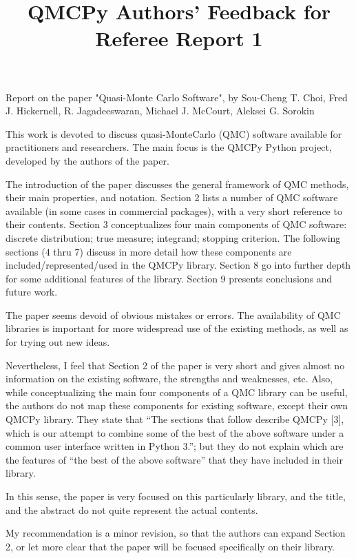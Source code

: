 \documentclass{amsart}
\begin{document}
\title{QMCPy Authors' Feedback for Referee Report 1}


\maketitle

Report on the paper "Quasi-Monte Carlo Software", by Sou-Cheng T. Choi, Fred J. Hickernell, R. Jagadeeswaran, Michael J. McCourt, Aleksei G. Sorokin


This work is devoted to discuss quasi-MonteCarlo (QMC) software available for practitioners and researchers. The main focus is the QMCPy Python project, developed by the authors of the paper.

The introduction of the paper discusses the general framework of QMC methods, their main properties, and notation. Section 2 lists a number of QMC software available (in some cases in commercial packages), with a very short reference to their contents. Section 3 conceptualizes four main components of QMC software: discrete distribution; true measure; integrand; stopping criterion. The following sections (4 thru 7) discuss in more detail how these components are included/represented/used in the QMCPy library. Section 8 go into further depth for some additional features of the library. Section 9 presents conclusions and future work.

The paper seems devoid of obvious mistakes or errors. The  availability of QMC libraries is important for more widespread use of the existing methods, as well as for trying out new ideas.

Nevertheless, I feel that Section 2 of the paper is very short and gives almost no information on the existing software, the strengths and weaknesses, etc.  Also, while conceptualizing the main four components of a QMC library can be useful, the authors do not map these components for existing software, except their own QMCPy library. They state that ``The sections that follow describe QMCPy [3], which is our attempt to combine some of the best of the above software under a common user interface written in Python 3.''; but they do not explain which are the features of ``the best of the above software'' that they have included in their library.

In this sense, the paper is very focused on this particularly library, and the title, and the abstract do not quite represent the actual contents. 

My recommendation is a minor revision, so that the authors can expand Section 2, or let more clear that the paper will be focused specifically on their library.
\end{document}
